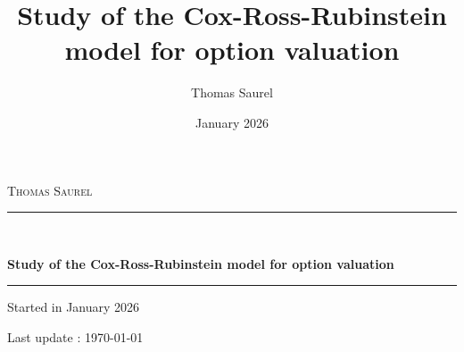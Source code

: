 \documentclass{article}
\title{Study of the Cox-Ross-Rubinstein model for option valuation}
\author{Thomas Saurel}
\date{January 2026}
\begin{document}
\begin{titlepage}
    \centering
    \vspace*{4cm}
    
    {\Large \textsc{Thomas Saurel} \par}
    
    \vspace{2.5cm}

    \rule{0.6\textwidth}{0.4pt} \\ [0.5cm]
    {\Huge \bfseries Study of the Cox-Ross-Rubinstein model for option valuation \par}
    \vspace{0.3cm}
    \rule{0.6\textwidth}{0.4pt}
    
    \vfill
    
    {\large Started in January 2026 \par}
    {\small Last update : \today \par}
    
\end{titlepage}

\newpage
\tableofcontents
\newpage


\newpage

\newpage

\newpage

\newpage

\newpage

\newpage

\newpage

\newpage

\newpage
\printbibliography
\end{document}
